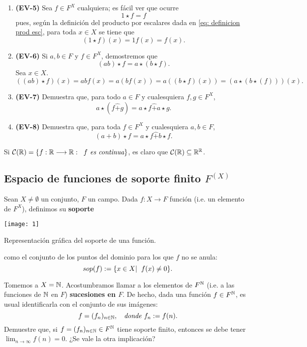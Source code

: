 \begin{enumerate}
	\item \textbf{(EV-5)} Sea $f \in F^{X}$ cualquiera;
	es fácil ver que ocurre
	\[
	1 \star f = f
	\]
	pues, según la definición del producto por escalares dada en 
	\eqref{eq: definicion prod esc}, 
	para toda $x \in X$ se tiene que
	\[
	(1 \star f)(x) = 1 f(x) = f(x).
	\]
	\item \textbf{(EV-6)} Si $a, b \in F$
	y $f \in F^{X}$, demostremos que
	\[
	(ab) \star f = a \star (b \star f).
	\] 
	Sea $x \in X$.
	\[
	((ab) \star f)(x) = ab f(x) = a (bf(x))
	= a ((b \star f)(x)) = (a \star (b \star (f)))(x).
	\]
	\item \textbf{(EV-7)}
	 Demuestra que,
	para todo $a \in F$ y cualesquiera
	$f, g \in F^{X}$, 
	\[
	a \star (f \hat{+} g) = a \star f \hat{+} a \star g.
	\]
	
	\item \textbf{(EV-8)}
	 Demuestra que,
	para toda $f \in F^{X}$ y cualesquiera
	$a, b \in F$, 
	\[
	(a + b) \star f = a \star f \hat{+} b \star f.
	\]
	
\end{enumerate}

\begin{ejem}
Si $\mathcal{C}(\mathbb{R}) = \{ f: \mathbb{R} \longrightarrow \mathbb{R} :
\hspace{0.2cm} f \textit{ es continua} \}$,
es claro que 
$\mathcal{C}(\mathbb{R}) \subseteq \mathbb{R}^{\mathbb{R}}$.
\end{ejem}


\subsection{Espacio de funciones de soporte finito $F^{(X)}$}

\begin{defi}
Sean $X \neq \emptyset$ un conjunto, $F$ un campo. Dada
$f: X \longrightarrow F$ función (i.e. un elemento
de $F^{X}$), definimos su \textbf{soporte}
\begin{marginfigure}
\texttt{[image:  1]} 
		\caption{Representación gráfica del soporte de una función.}
\end{marginfigure}
como el conjunto de los puntos del dominio para 
los que $f$ no se anula:
\[
sop(f) :=
\{ x \in X  | \hspace{0.2cm} f(x) \neq 0 \}.
\]

\end{defi}

\begin{ejem}
Tomemos a $X = \mathbb{N}$. Acostumbramos llamar a los 
elementos de $F^{\mathbb{N}}$ 
(i.e. a las funciones de $\mathbb{N}$ en $F$)
\textbf{sucesiones en $F$}.
De hecho, dada una función $f \in F^{\mathbb{N}}$, 
es usual identificarla con el conjunto de sus imágenes:
\[
f = (f_{n})_{n \in \mathbb{N}}, 
\hspace{0.2cm} \textit{ donde }
f_{n} := f(n).
\]
 Demuestre que,
si $f = (f_{n})_{n \in \mathbb{N}} \in F ^{\mathbb{N}}$ tiene soporte 
finito, entonces 
se debe tener
$\lim_{n \rightarrow \infty} f(n) = 0$.
¿Se vale la otra implicación?
\diam
\end{ejem}


